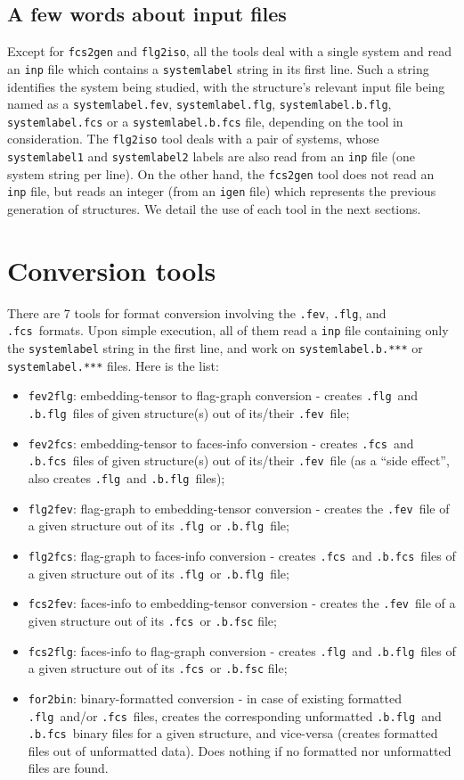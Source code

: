 \documentclass{scrreprt}
\newcommand{\fev}{\texttt{.fev}}
\newcommand{\fcs}{\texttt{.fcs}}
\newcommand{\flg}{\texttt{.flg}}
\newcommand{\fcsb}{\texttt{.b.fcs}}
\newcommand{\flgb}{\texttt{.b.flg}}
\begin{document}
\subsection{A few words about input files}
Except for \verb-fcs2gen- and \verb-flg2iso-, all the tools deal with a single system and read an \verb-inp- file which contains a \verb-systemlabel- string in its first line. Such a string identifies the system being studied, with the structure's relevant input file being named as a \verb-systemlabel.fev-, \verb-systemlabel.flg-, \verb-systemlabel.b.flg-, \verb-systemlabel.fcs- or a \verb-systemlabel.b.fcs- file, depending on the tool in consideration. The \verb-flg2iso- tool deals with a pair of systems, whose \verb-systemlabel1- and \verb-systemlabel2- labels are also read from an \verb-inp- file (one system string per line). On the other hand, the \verb-fcs2gen- tool does not read an \verb-inp- file, but reads an integer (from an \verb-igen- file) which represents the previous generation of structures. We detail the use of each tool in the next sections.


\section{Conversion tools}
There are 7 tools for format conversion involving the \fev, \flg, and \fcs~formats. Upon simple execution, all of them read a \verb-inp- file containing only the \verb-systemlabel- string in the first line, and work on \verb-systemlabel.b.***- or \verb-systemlabel.***- files. Here is the list:

\begin{itemize}
 \item \verb-fev2flg-: embedding-tensor to flag-graph conversion - creates \flg~and \flgb~files of given structure(s) out of its/their \fev~file;
 \item \verb-fev2fcs-: embedding-tensor to faces-info conversion - creates \fcs~and \fcsb~files of given structure(s) out of its/their \fev~file (as a ``side effect'', also creates \flg~and \flgb~files);
 \item \verb-flg2fev-: flag-graph to embedding-tensor conversion - creates the \fev~file of a given structure out of its \flg~or \flgb~file;
 \item \verb-flg2fcs-: flag-graph to faces-info conversion - creates \fcs~and \fcsb~files of a given structure out of its \flg~or \flgb~file;
 \item \verb-fcs2fev-: faces-info to embedding-tensor conversion - creates the \fev~file of a given structure out of its \fcs~or \verb-.b.fsc- file;
 \item \verb-fcs2flg-: faces-info to flag-graph conversion - creates \flg~and \flgb~files of a given structure out of its \fcs~or \verb-.b.fsc- file;
 \item \verb-for2bin-: binary-formatted conversion - in case of existing formatted \flg~and/or \fcs~files, creates the corresponding unformatted \flgb~and \fcsb~binary files for a given structure, and vice-versa (creates formatted files out of unformatted data). Does nothing if no formatted nor unformatted files are found.
\end{itemize}
\end{document}
